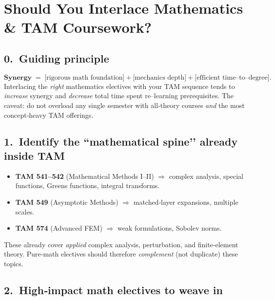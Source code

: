 \documentclass[12pt]{article}
\theoremstyle{definition} %
\theoremstyle{plain} %
\begin{document}
\section*{Should You Interlace Mathematics \& TAM Coursework?}

\subsection*{0.\  Guiding principle}
\[
  \textbf{Synergy} \;=\; 
    \bigl[\text{rigorous math foundation}\bigr]
    + \bigl[\text{mechanics depth}\bigr]
    + \bigl[\text{efficient time--to–degree}\bigr].
\]
Interlacing the \emph{right} mathematics electives with your TAM
sequence tends to \emph{increase} synergy and \emph{decrease} total
time spent re–learning prerequisites.  
The caveat: do not overload any single semester with all‑theory courses
\emph{and} the most concept‑heavy TAM offerings.

\subsection*{1.\  Identify the “mathematical spine’’ already inside TAM}

\begin{itemize}
  \item \textbf{TAM 541–542} (Mathematical Methods I–II)  
        \quad$\Rightarrow$ complex analysis, special functions, Greens
        functions, integral transforms.
  \item \textbf{TAM 549} (Asymptotic Methods)  
        \quad$\Rightarrow$ matched‐layer expansions, multiple scales.
  \item \textbf{TAM 574} (Advanced FEM)  
        \quad$\Rightarrow$ weak formulations, Sobolev norms.
\end{itemize}

\noindent
These already cover \emph{applied} complex analysis, perturbation, and
finite‑element theory.  
Pure‑math electives should therefore \emph{complement} (not duplicate)
these topics.

\subsection*{2.\  High‑impact math electives to weave in}
\end{document}
